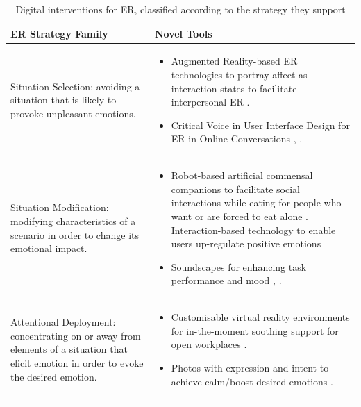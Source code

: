 \documentclass[acmtog]{acmart}
\begin{document}
\begin{table}[htbp]
\centering
\caption{Digital interventions for ER, classified according to the strategy they support}
\label{tab:interv_table}
\begin{tabular}{m{6cm}m{10cm}}
\hline
\textbf{ER Strategy Family}                                                                                                             & \textbf{Novel Tools}                                                                                                                                                                                                                                                       \\ \hline
Situation Selection: avoiding a situation that is likely to provoke unpleasant emotions.                                                 & \begin{itemize}
\item Augmented Reality-based ER technologies to portray affect as interaction states to facilitate interpersonal ER \cite{semertzidis2020neo}.
\item Critical Voice in User Interface Design for ER in Online Conversations \cite{kiskola2021applying}, \cite{kou2020emotion}.
\end{itemize}                             \\ \hline
Situation Modification: modifying characteristics of a scenario in order to change its emotional impact.                                 & \begin{itemize}
\item Robot-based artificial commensal companions to facilitate social interactions while eating for people who want or are forced to eat alone \cite{mancini2020room}. Interaction-based technology to enable users up-regulate positive emotions \cite{li2020purpal}
\item Soundscapes for enhancing task performance and mood \cite{newbold2017using}, \cite{yu2018delight}.
\end{itemize}                 \\ \hline
Attentional Deployment: concentrating on or away from elements of a situation that elicit emotion in order to evoke the desired emotion. & \begin{itemize}
\item Customisable virtual reality environments for in-the-moment soothing support for open workplaces \cite{ruvimova2020transport}.
\item Photos with expression and intent to achieve calm/boost desired emotions \cite{chen2016promoting}.

\end{itemize}
\end{tabular}
\end{table}
\end{document}
